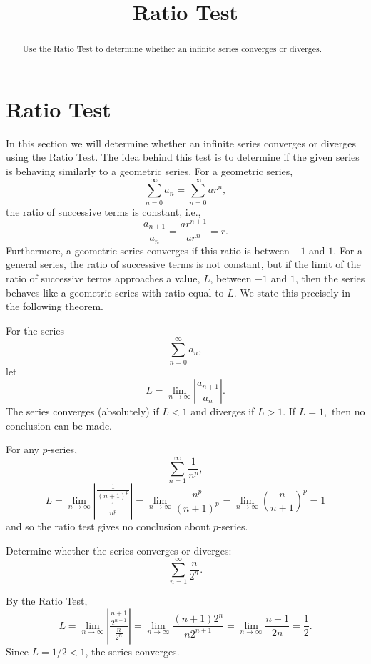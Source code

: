 \documentclass{ximera}
\title{Ratio Test}
\begin{document}
\begin{abstract}
Use the Ratio Test to determine whether an infinite series converges or diverges.
\end{abstract}

\maketitle

\section{Ratio Test}

In this section we will determine whether an infinite series converges or diverges using the Ratio Test. 
The idea behind this test is to determine if the given series is behaving similarly to a geometric series.
For a geometric series, 
\[
\sum_{n=0}^\infty a_n = \sum_{n=0}^\infty ar^n,
\]
the ratio of successive terms is constant, i.e., 
\[
\frac{a_{n+1}}{a_n} = \frac{ar^{n+1}}{ar^n} = r.
\]
Furthermore, a geometric series converges if this ratio is between $-1$ and $1$.
For a general series, the ratio of successive terms is not constant, but if the limit of the ratio of successive terms
approaches a value, $L$, between $-1$ and $1$, then the series behaves like a geometric series with ratio equal to $L$.
We state this precisely in the following theorem.

\begin{theorem}
For the series
\[
\sum_{n=0}^\infty a_n,
\]
let
\[
L = \lim_{n \to \infty} \left|\frac{a_{n+1}}{a_n}\right|.
\]
The series converges (absolutely) if $L < 1$ and diverges if $L>1$. 
If $L = 1,$ then no conclusion can be made.

\end{theorem}
 
\begin{remark}
For any $p$-series,
\[
\sum_{n=1}^\infty \frac{1}{n^p},
\]
\[
L =  \lim_{n \to \infty} \left|\frac{\frac{1}{(n+1)^p}}{\frac{1}{n^p}}\right| = \lim_{n \to \infty} \frac{n^p}{(n+1)^p} =  \lim_{n \to \infty} \left(\frac{n}{n+1}\right)^p = 1
\]
and so the ratio test gives no conclusion about $p$-series.
\end{remark}

\begin{example}[example 1]
Determine whether the series converges or diverges:
\[
\sum_{n=1}^\infty \frac{n}{2^n}.
\]

By the Ratio Test,
\[
L =  \lim_{n \to \infty} \left|\frac{\frac{n+1}{2^{n+1}}}{\frac{n}{2^n}}\right| =  \lim_{n \to \infty} \frac{(n+1)2^n}{n2^{n+1}} 
=  \lim_{n \to \infty} \frac{n+1}{2n} = \frac12.
\]
Since $L = 1/2 < 1$, the series converges.
\end{example}
\end{document}
